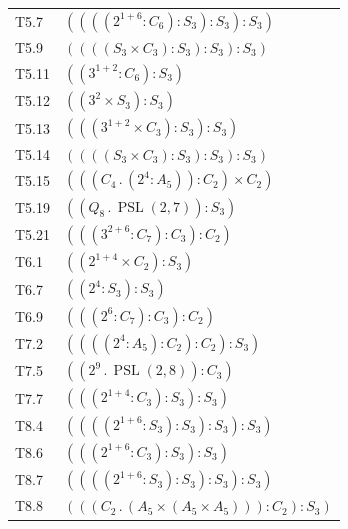 \documentclass[11pt,a4paper]{article}
\begin{document}
\begin{longtable}{@{}lp{133mm}@{}}
T5.7 & $((((2^{1+6}:\allowbreak C_{6}):\allowbreak S_{3}):\allowbreak S_{3}):\allowbreak S_{3})$\\
T5.9 & $((((S_{3}\times\allowbreak C_{3}):\allowbreak S_{3}):\allowbreak S_{3}):\allowbreak S_{3})$\\
T5.11 & $((3^{1+2}:\allowbreak C_{6}):\allowbreak S_{3})$\\
T5.12 & $((3^{2}\times\allowbreak S_{3}):\allowbreak S_{3})$\\
T5.13 & $(((3^{1+2}\times\allowbreak C_{3}):\allowbreak S_{3}):\allowbreak S_{3})$\\
T5.14 & $((((S_{3}\times\allowbreak C_{3}):\allowbreak S_{3}):\allowbreak S_{3}):\allowbreak S_{3})$\\
T5.15 & $(((C_{4}\mathbin{.}\allowbreak (2^{4}:\allowbreak A_{5})):\allowbreak C_{2})\times\allowbreak C_{2})$\\
T5.19 & $((Q_8\mathbin{.}\allowbreak \operatorname{PSL}(2,7)):\allowbreak S_{3})$\\
T5.21 & $(((3^{2+6}:\allowbreak C_{7}):\allowbreak C_{3}):\allowbreak C_{2})$\\
T6.1 & $((2^{1+4}\times\allowbreak C_{2}):\allowbreak S_{3})$\\
T6.7 & $((2^{4}:\allowbreak S_{3}):\allowbreak S_{3})$\\
T6.9 & $(((2^{6}:\allowbreak C_{7}):\allowbreak C_{3}):\allowbreak C_{2})$\\
T7.2 & $((((2^{4}:\allowbreak A_{5}):\allowbreak C_{2}):\allowbreak C_{2}):\allowbreak S_{3})$\\
T7.5 & $((2^{9}\mathbin{.}\allowbreak \operatorname{PSL}(2,8)):\allowbreak C_{3})$\\
T7.7 & $(((2^{1+4}:\allowbreak C_{3}):\allowbreak S_{3}):\allowbreak S_{3})$\\
T8.4 & $((((2^{1+6}:\allowbreak S_{3}):\allowbreak S_{3}):\allowbreak S_{3}):\allowbreak S_{3})$\\
T8.6 & $(((2^{1+6}:\allowbreak C_{3}):\allowbreak S_{3}):\allowbreak S_{3})$\\
T8.7 & $((((2^{1+6}:\allowbreak S_{3}):\allowbreak S_{3}):\allowbreak S_{3}):\allowbreak S_{3})$\\
T8.8 & $(((C_{2}\mathbin{.}\allowbreak (A_{5}\times\allowbreak (A_{5}\times\allowbreak A_{5}))):\allowbreak C_{2}):\allowbreak S_{3})$\\
\bottomrule\end{longtable}
\endgroup
\end{document}
